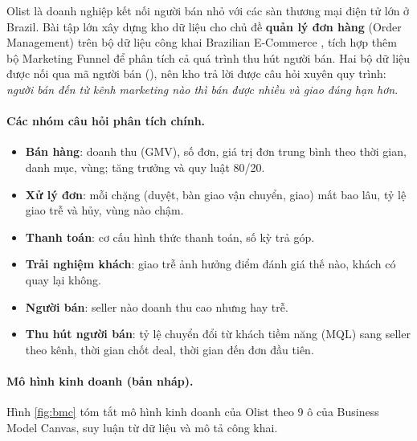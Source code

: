 Olist là doanh nghiệp kết nối người bán nhỏ với các sàn thương mại điện tử lớn ở Brazil. Bài tập lớn xây dựng kho dữ liệu cho chủ đề \textbf{quản lý đơn hàng} (Order Management) trên bộ dữ liệu công khai Brazilian E-Commerce \cite{olist_ecommerce}, tích hợp thêm bộ Marketing Funnel \cite{olist_marketing} để phân tích cả quá trình thu hút người bán. Hai bộ dữ liệu được nối qua mã người bán (), nên kho trả lời được câu hỏi xuyên quy trình: \emph{người bán đến từ kênh marketing nào thì bán được nhiều và giao đúng hạn hơn}.


\paragraph{Các nhóm câu hỏi phân tích chính.}
\begin{itemize}
  \item \textbf{Bán hàng}: doanh thu (GMV), số đơn, giá trị đơn trung bình theo thời gian, danh mục, vùng; tăng trưởng và quy luật 80/20.
  \item \textbf{Xử lý đơn}: mỗi chặng (duyệt, bàn giao vận chuyển, giao) mất bao lâu, tỷ lệ giao trễ và hủy, vùng nào chậm.
  \item \textbf{Thanh toán}: cơ cấu hình thức thanh toán, số kỳ trả góp.
  \item \textbf{Trải nghiệm khách}: giao trễ ảnh hưởng điểm đánh giá thế nào, khách có quay lại không.
  \item \textbf{Người bán}: seller nào doanh thu cao nhưng hay trễ.
  \item \textbf{Thu hút người bán}: tỷ lệ chuyển đổi từ khách tiềm năng (MQL) sang seller theo kênh, thời gian chốt deal, thời gian đến đơn đầu tiên.
\end{itemize}

\paragraph{Mô hình kinh doanh (bản nháp).} Hình \ref{fig:bmc} tóm tắt mô hình kinh doanh của Olist theo 9 ô của Business Model Canvas, suy luận từ dữ liệu và mô tả công khai.
